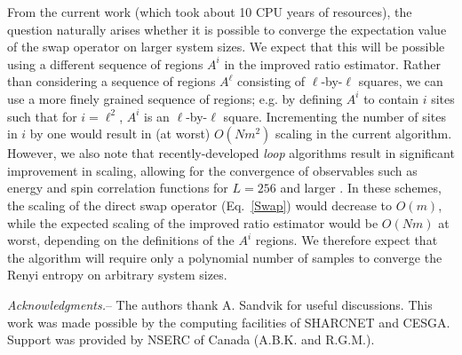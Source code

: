 \documentclass[prl,aps,twocolumn,floatfix,amsmath,amssymb,superscriptaddress,tightenlines]{revtex4}
\begin{document}
From the current work (which took about 10 CPU years of resources), 
the question naturally arises whether it is possible to converge the expectation value of the swap operator on
larger system sizes. 
We expect that this will be possible using a different
sequence of regions $A^i$ in the improved ratio estimator.
Rather than considering a sequence of regions $A^{\ell}$ consisting of $\ell$-by-$\ell$ squares, 
we can use a more finely grained sequence of regions; e.g. by defining $A^i$ to contain
$i$ sites such that for $i=\ell^2$, $A^i$ is an $\ell$-by-$\ell$ square.  Incrementing the number of sites in $i$ by one would result in
(at worst) $O(Nm^2)$ scaling in the current algorithm.  
However, we also note that recently-developed {\it loop} algorithms
result in significant improvement in scaling, allowing for the convergence of observables such as energy and spin correlation functions for $L=256$ and larger \cite{AWSloop}.  In these schemes, the scaling of the direct swap operator (Eq.~\eqref{Swap}) 
would decrease to $O(m)$, while the expected scaling of the improved ratio estimator would be $O(Nm)$ at worst, depending
on the definitions of the $A^i$ regions.
We therefore expect that the algorithm will require only a polynomial number of samples to converge the Renyi entropy on arbitrary system sizes.


{\it Acknowledgments.}-- The authors thank A. Sandvik for useful discussions.
This work was made possible by the
computing facilities of SHARCNET and CESGA.  Support was provided by NSERC
of Canada (A.B.K. and R.G.M.).


\end{document}
